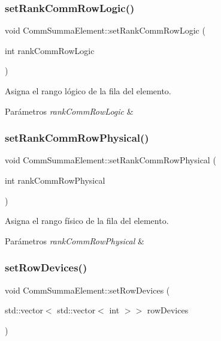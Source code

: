 \subsubsection{\texorpdfstring{set\+Rank\+Comm\+Row\+Logic()}{setRankCommRowLogic()}}
{\footnotesize\ttfamily void Comm\+Summa\+Element\+::set\+Rank\+Comm\+Row\+Logic (\begin{DoxyParamCaption}\item[{int}]{rank\+Comm\+Row\+Logic }\end{DoxyParamCaption})}



Asigna el rango lógico de la fila del elemento. 


\begin{DoxyParams}{Parámetros}
{\em rank\+Comm\+Row\+Logic} & \\
\hline
\end{DoxyParams}
\mbox{\label{classCommSummaElement_ac53991daf63f3bec0b4954b62f724391}} 
\subsubsection{\texorpdfstring{set\+Rank\+Comm\+Row\+Physical()}{setRankCommRowPhysical()}}
{\footnotesize\ttfamily void Comm\+Summa\+Element\+::set\+Rank\+Comm\+Row\+Physical (\begin{DoxyParamCaption}\item[{int}]{rank\+Comm\+Row\+Physical }\end{DoxyParamCaption})}



Asigna el rango físico de la fila del elemento. 


\begin{DoxyParams}{Parámetros}
{\em rank\+Comm\+Row\+Physical} & \\
\hline
\end{DoxyParams}
\mbox{\label{classCommSummaElement_aede64abc22748c06ea085d804d97f685}} 
\subsubsection{\texorpdfstring{set\+Row\+Devices()}{setRowDevices()}}
{\footnotesize\ttfamily void Comm\+Summa\+Element\+::set\+Row\+Devices (\begin{DoxyParamCaption}\item[{std\+::vector$<$ std\+::vector$<$ int $>$$>$}]{row\+Devices }\end{DoxyParamCaption})}



